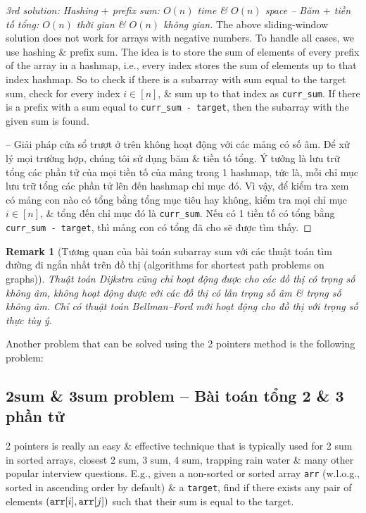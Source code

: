 \documentclass{article}
\newtheorem{remark}{Remark}
\begin{document}
\begin{proof}[3rd solution: Hashing $+$ prefix sum: $O(n)$ time \& $O(n)$ space -- Băm $+$ tiền tố tổng: $O(n)$ thời gian \& $O(n)$ không gian]
    The above sliding-window solution does not work for arrays with negative numbers. To handle all cases, we use hashing \& prefix sum. The idea is to store the sum of elements of every prefix of the array in a hashmap, i.e., every index stores the sum of elements up to that index hashmap. So to check if there is a subarray with sum equal to the target sum, check for every index $i\in[n]$, \& sum up to that index as \verb|curr_sum|. If there is a prefix with a sum equal to \verb|curr_sum - target|, then the subarray with the given sum is found.

    -- Giải pháp cửa sổ trượt ở trên không hoạt động với các mảng có số âm. Để xử lý mọi trường hợp, chúng tôi sử dụng băm \& tiền tố tổng. Ý tưởng là lưu trữ tổng các phần tử của mọi tiền tố của mảng trong 1 hashmap, tức là, mỗi chỉ mục lưu trữ tổng các phần tử lên đến hashmap chỉ mục đó. Vì vậy, để kiểm tra xem có mảng con nào có tổng bằng tổng mục tiêu hay không, kiểm tra mọi chỉ mục $i\in[n]$, \& tổng đến chỉ mục đó là \verb|curr_sum|. Nếu có 1 tiền tố có tổng bằng \verb|curr_sum - target|, thì mảng con có tổng đã cho sẽ được tìm thấy.
\end{proof}

\begin{remark}[Tương quan của bài toán subarray sum với các thuật toán tìm đường đi ngắn nhất trên đồ thị (algorithms for shortest path problems on graphs)]
    Thuật toán Dijkstra cũng chỉ hoạt động được cho các đồ thị có trọng số không âm, không hoạt động được với các đồ thị có lẫn trọng số âm \& trọng số không âm. Chỉ có thuật toán Bellman--Ford mới hoạt động cho đồ thị với trọng số thực tùy ý.
\end{remark}
Another problem that can be solved using the 2 pointers method is the following {} problem:


\subsection{{\sc2sum} \& {\sc3sum} problem -- Bài toán tổng 2 \& 3 phần tử}
2 pointers is really an easy \& effective technique that is typically used for 2 sum in sorted arrays, closest 2 sum, 3 sum, 4 sum, trapping rain water \& many other popular interview questions. E.g., given a non-sorted or sorted array {\tt arr} (w.l.o.g., sorted in ascending order by default) \& a {\tt target}, find if there exists any pair of elements $({\tt arr}[i],{\tt arr}[j])$ such that their sum is equal to the target.
\end{document}
